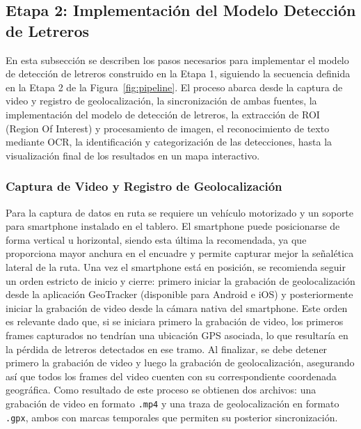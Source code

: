\documentclass[runningheads]{llncs}
\begin{document}
\subsection{Etapa 2: Implementación del Modelo Detección de Letreros}
En esta subsección se describen los pasos necesarios para implementar 
el modelo de detección de letreros construido en la Etapa 1, siguiendo 
la secuencia definida en la Etapa 2 de la Figura~\ref{fig:pipeline}. 
El proceso abarca desde la captura de video y registro de 
geolocalización, la sincronización de ambas fuentes, la implementación 
del modelo de detección de letreros, la extracción de ROI (Region Of Interest) y procesamiento de 
imagen, el reconocimiento de texto mediante OCR, la identificación y 
categorización de las detecciones, hasta la visualización final de los 
resultados en un mapa interactivo.


\subsubsection{Captura de Video y Registro de Geolocalización}
\label{sec:captura}
Para la captura de datos en ruta se requiere un vehículo motorizado y 
un soporte para smartphone instalado en el tablero. El smartphone puede posicionarse de forma vertical u horizontal, siendo esta última la recomendada,
ya que proporciona mayor anchura en el 
encuadre y permite capturar mejor la señalética lateral de la ruta. 
Una vez el smartphone está en posición, se recomienda seguir un orden 
estricto de inicio y cierre: primero iniciar la grabación de 
geolocalización desde la aplicación GeoTracker (disponible para Android
e iOS) \cite{geotracker} y posteriormente iniciar la grabación de video desde la cámara nativa 
del smartphone. Este orden es relevante dado que, si se iniciara primero 
la grabación de video, los primeros frames capturados no tendrían una 
ubicación GPS asociada, lo que resultaría en la pérdida de letreros 
detectados en ese tramo. Al finalizar, se debe detener primero la 
grabación de video y luego la grabación de geolocalización, asegurando 
así que todos los frames del video cuenten con su correspondiente 
coordenada geográfica. Como resultado de este proceso se obtienen dos 
archivos: una grabación de video en formato \texttt{.mp4} y una traza 
de geolocalización en formato \texttt{.gpx}, ambos con marcas 
temporales que permiten su posterior sincronización.
\end{document}
